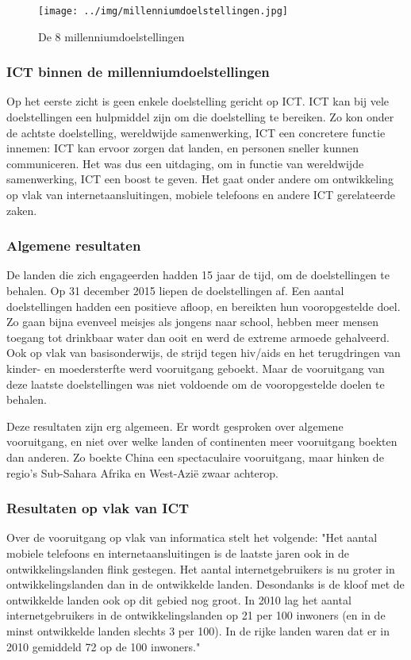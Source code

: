 \begin{figure}[h!]
	\texttt{[image: ../img/millenniumdoelstellingen.jpg]}
	\caption{De 8 millenniumdoelstellingen \autocite{NOS2015}}
	\label{milleniumdoelstellingen}
\end{figure}

 \subsubsection{ICT binnen de millenniumdoelstellingen}
 Op het eerste zicht is geen enkele doelstelling gericht op ICT. ICT kan bij vele doelstellingen een hulpmiddel zijn om die doelstelling te bereiken. Zo kon onder de achtste doelstelling, wereldwijde samenwerking, ICT een concretere functie innemen: ICT kan ervoor zorgen dat landen, en personen sneller kunnen communiceren. Het was dus een uitdaging, om in functie van wereldwijde samenwerking, ICT een boost te geven. Het gaat onder andere om ontwikkeling op vlak van internetaansluitingen, mobiele telefoons en andere ICT gerelateerde zaken. \autocite{NOS2015}
 
 
 \subsubsection{Algemene resultaten}
 De landen die zich engageerden hadden 15 jaar de tijd, om de doelstellingen te behalen. Op 31 december 2015 liepen de doelstellingen af.
 Een aantal doelstellingen hadden een positieve afloop, en bereikten hun vooropgestelde doel. Zo gaan bijna evenveel meisjes als jongens naar school, hebben meer mensen toegang tot drinkbaar water dan ooit en werd de extreme armoede gehalveerd. Ook op vlak van basisonderwijs, de strijd tegen hiv/aids en het terugdringen van kinder- en moedersterfte werd vooruitgang geboekt. Maar de vooruitgang van deze laatste doelstellingen was niet voldoende om de vooropgestelde doelen te behalen. \autocite{Tierens2014}

Deze resultaten zijn erg algemeen. Er wordt gesproken over algemene vooruitgang, en niet over welke landen of continenten meer vooruitgang boekten dan anderen. Zo boekte China een spectaculaire vooruitgang, maar hinken de regio's Sub-Sahara Afrika en West-Azië zwaar achterop. \autocite{Tierens2014}
 
  \subsubsection{Resultaten op vlak van ICT}
Over de vooruitgang op vlak van informatica stelt \autocite{Kampherbeek2012} het volgende: "Het aantal mobiele telefoons en internetaansluitingen is de laatste jaren ook in de ontwikkelingslanden flink gestegen. Het aantal internetgebruikers is nu groter in ontwikkelingslanden dan in de ontwikkelde landen. Desondanks is de kloof met de ontwikkelde landen ook op dit gebied nog groot. In 2010 lag het aantal internetgebruikers in de ontwikkelingslanden op 21 per 100 inwoners (en in de minst ontwikkelde landen slechts 3 per 100). In de rijke landen waren dat er in 2010 gemiddeld 72 op de 100 inwoners."
  
